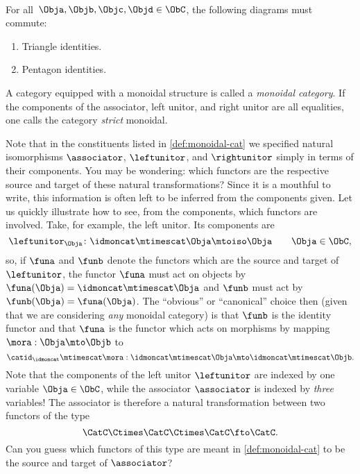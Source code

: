 \begin{ctdefinition}
	\condit\\
	For all~$\Obja,\Objb,\Objc,\Objd\in \ObC$, the following diagrams must commute:
	\begin{enumerate}
		\item Triangle identities.
		      \begin{center}
		      \end{center}
		\item Pentagon identities.\\
	\end{enumerate}
	\begin{center}
	\end{center}
	A category equipped with a monoidal structure is called a \emph{monoidal category}.
	If the components of the associator, left unitor, and right unitor are all equalities, one calls the category \emph{strict} monoidal.
\end{ctdefinition}

\begin{remark}
	Note that in the constituents listed in \cref{def:monoidal-cat} we specified natural isomorphisms $\associator$, $\leftunitor$, and $\rightunitor$ simply in terms of their components.
	You may be wondering: which functors are the respective source and target of these natural transformations?
	Since it is a mouthful to write, this information is often left to be inferred from the components given.
	Let us quickly illustrate how to see, from the components, which functors are involved.
	Take, for example, the left unitor.
	Its components are
	\begin{equation*}
		\leftunitor_\Obja \colon \idmoncat\mtimescat \Obja \mtoiso \Obja \quad \quad \Obja\in \ObC,
	\end{equation*}
	so, if $\funa$ and $\funb$ denote the functors which are the source and target of $\leftunitor$, the functor $\funa$ must act on objects by $\funa(\Obja) = \idmoncat \mtimescat \Obja$ and $\funb$ must act by $\funb(\Obja) = \funa(\Obja)$.
	The ``obvious'' or ``canonical'' choice then (given that we are considering \emph{any} monoidal category) is that $\funb$ is the identity functor and that $\funa$ is the functor which acts on morphisms by mapping $\mora : \Obja \mto \Objb$ to
	\begin{equation}
		\catid_\idmoncat \mtimescat \mora:   \idmoncat\mtimescat \Obja \mto  \idmoncat\mtimescat \Objb.
	\end{equation}
	Note that the components of the left unitor $\leftunitor$ are indexed by one variable $\Obja \in \ObC$, while the associator $\associator$ is indexed by \emph{three} variables!
	The associator is therefore a natural transformation between two functors of the type
	\begin{equation}
		\CatC \Ctimes \CatC \Ctimes \CatC \fto \CatC.
	\end{equation}
	Can you guess which functors of this type are meant in \cref{def:monoidal-cat} to be the source and target of $\associator$?
\end{remark}

